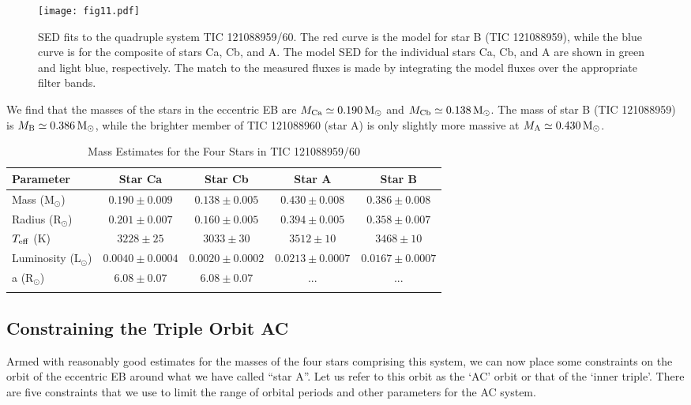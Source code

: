 \documentclass[fleqn,usenatbib]{mnras} %
\begin{document}
\begin{figure}
\centering
\texttt{[image: fig11.pdf]}
\caption{SED fits to the quadruple system TIC 121088959/60.  The red curve is the model for star B (TIC 121088959), while the blue curve is for the composite of stars Ca, Cb, and A. The model SED for the individual stars Ca, Cb, and A are shown in green and light blue, respectively. The match to the measured fluxes is made by integrating the model fluxes over the appropriate filter bands.}
\label{fig:SED}
\end{figure}

We find that the masses of the stars in the eccentric EB are $M_{\rm Ca} \simeq 0.190 \,{\rm M}_\odot$ and $M_{\rm Cb} \simeq 0.138 \,{\rm M}_\odot$.  The mass of star B (TIC 121088959) is $M_{\rm B} \simeq 0.386 \,{\rm M}_\odot$, while the brighter member of TIC 121088960 (star A) is only slightly more massive at $M_{\rm A} \simeq 0.430 \,{\rm M}_\odot$.

\begin{table*}
\centering
\caption{Mass Estimates for the Four Stars in TIC 121088959/60}
\begin{tabular}{lcccc}
\hline
\hline
Parameter    &   Star Ca & Star Cb & Star A & Star B  \\
\hline
 Mass (M$_\odot$) & $0.190\pm0.009$ & $0.138\pm 0.005$  & $0.430\pm0.008$  & $0.386\pm0.008$ \\
 Radius (R$_\odot$)  & $0.201\pm0.007$  & $0.160\pm0.005$   & $0.394\pm0.005$  & $0.358\pm0.007$ \\
 $T_{\rm eff}$ (K)  & $3228\pm25$  & $3033\pm30$   & $3512\pm10$  &  $3468\pm10$ \\
 Luminosity  (L$_\odot$) & $0.0040\pm0.0004$ &  $0.0020\pm0.0002$  & $0.0213\pm0.0007$ & $0.0167\pm0.0007$ \\
 a (R$_\odot$)  & $6.08 \pm 0.07$ & $6.08 \pm 0.07$ & ... & ... \\
\hline
\label{tbl:MRTL}
\end{tabular}
\end{table*}

\subsection{Constraining the Triple Orbit AC}
\label{sec:triple_orbit}

Armed with reasonably good estimates for the masses of the four stars comprising this system, we can now place some constraints on the orbit of the eccentric EB around what we have called ``star A''.  Let us refer to this orbit as the `AC' orbit or that of the `inner triple'.  There are five constraints that we use to limit the range of orbital periods and other parameters for the AC system.
\end{document}
